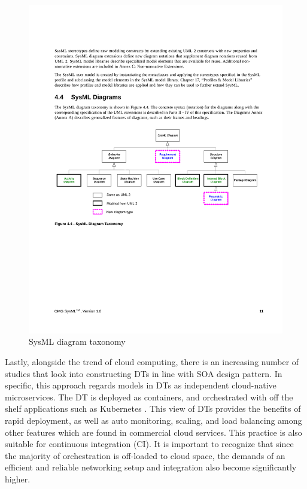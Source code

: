 \documentclass[journal,onecolumn]{IEEEtran} %
\begin{document}
\begin{figure}[hbt!]
  \centering
  \includegraphics[scale=0.8]{figures/sysml_tax.pdf}
  \caption{SysML diagram taxonomy \cite{sysmlspec}}
  \label{fig:sysmltax}
\end{figure}

Lastly, alongside the trend of cloud computing, there is an increasing number of studies \cite{Preuveneers2018, Borghesi2021, Hung2022} that look into constructing DTs in line with SOA design pattern. In specific, this approach regards models in DTs as independent cloud-native microservices. The DT is deployed as containers, and orchestrated with off the shelf applications such as Kubernetes \cite{Kubernetes}. This view of DTs provides the benefits of rapid deployment, as well as auto monitoring, scaling, and load balancing among other features which are found in commercial cloud services. This practice is also suitable for continuous integration (CI). It is important to recognize that since the majority of orchestration is off-loaded to cloud space, the demands of an efficient and reliable networking setup and integration also become significantly higher.
\end{document}
